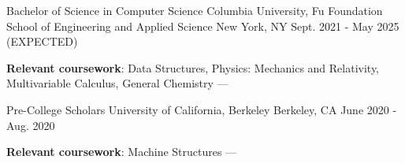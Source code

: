 
\begin{cventries}
  \cventry
  {Bachelor of Science in Computer Science} %
  {Columbia University, Fu Foundation School of Engineering and Applied Science} %
  {New York, NY} %
  {Sept. 2021 - May 2025 (EXPECTED)} %
  {
    \begin{cvitems} %
      \item {\textbf{Relevant coursework}: Data Structures, Physics: Mechanics and Relativity, Multivariable Calculus, General Chemistry --- }
    \end{cvitems}
  }

  \cventry
  {Pre-College Scholars} %
  {University of California, Berkeley} %
  {Berkeley, CA} %
  {June 2020 - Aug. 2020} %
  {
    \begin{cvitems} %
      \item {\textbf{Relevant coursework}: Machine Structures --- }
    \end{cvitems}
  }
\end{cventries}
